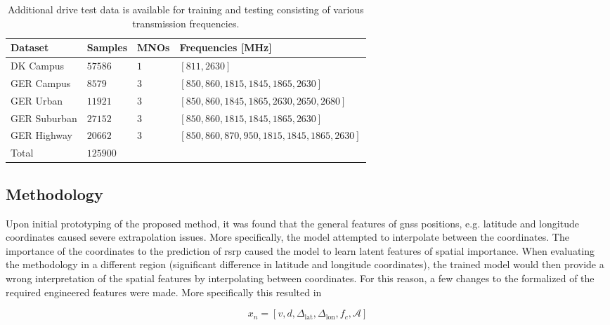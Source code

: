 \begin{table*}[h]
\footnotesize
\begin{tabular}{@{}llll@{}}
\toprule
Dataset      & Samples & MNOs & Frequencies  [MHz]       \\ \midrule
DK Campus    & $57586$   & $1$    & $[811, 2630]$ \\
GER Campus   & $8579$    & $3$    & $[850, 860, 1815, 1845, 1865, 2630]$                   \\
GER Urban    & $11921$   & $3$    &  $[850, 860, 1845, 1865, 2630, 2650, 2680]$ \\
GER Suburban & $27152$   & $3$    &  $[850, 860, 1815, 1845, 1865,2630]$                   \\
GER Highway  & $20662$   & $3$    & $[850, 860, 870, 950, 1815, 1845, 1865,2630]$                    \\ \midrule
Total        & $125900$  &      &                     \\ \bottomrule
\end{tabular}
\vspace{1em}
\caption{Additional drive test data is available for training and testing consisting of various transmission frequencies.}\label{tab:drive_test_data_total}
\end{table*}

\subsection{Methodology}\label{subsec:osm_methodology}

Upon initial prototyping of the proposed method, it was found that the general features of \gls{gnss} positions, e.g. latitude and longitude coordinates caused severe extrapolation issues. More specifically, the model attempted to interpolate between the coordinates. The importance of the coordinates to the prediction of \gls{rsrp} caused the model to learn latent features of spatial importance. When evaluating the methodology in a different region (significant difference in latitude and longitude coordinates), the trained model would then provide a wrong interpretation of the spatial features by interpolating between coordinates. For this reason, a few changes to the formalized of the required engineered features were made. More specifically this resulted in

\begin{equation}
    x_n = [v, d, \Delta_\text{lat}, \Delta_\text{lon},  f_c, \mathcal{A}]
\end{equation}

